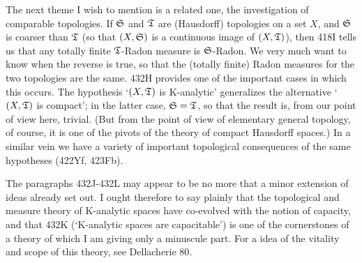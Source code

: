 {The next theme I wish to mention is a related one, the investigation of 
comparable topologies.   If $\frak S$ and $\frak T$ are (Hausdorff) 
topologies on a set $X$, and $\frak S$ is coarser than $\frak T$ (so 
that $(X,\frak S)$ is a continuous image of $(X,\frak T)$), then 
418I tells us that any totally finite $\frak T$-Radon 
measure is $\frak S$-Radon.   We very much want to know when the reverse 
is true, so that the (totally finite) Radon measures for the two 
topologies are the same.   432H provides one of the important cases in 
which this occurs.   The hypothesis `$(X,\frak T)$ is K-analytic' 
generalizes the alternative \lq$(X,\frak T)$ is compact';  in the latter 
case, $\frak S=\frak T$, so that the result is, from our point of view 
here, trivial.   (But from the point of view of elementary general 
topology, of course, it is one of the pivots of the theory of compact 
Hausdorff spaces.)   In a similar vein we have a variety of important 
topological consequences of the same hypotheses (422Yf, 423Fb). 
      
The paragraphs 432J-432L %
may appear to be no more that a minor 
extension of ideas already set out.   I ought therefore to say plainly 
that the topological and measure theory of K-analytic spaces have 
co-evolved with the notion of capacity, and that 432K (`K-analytic 
spaces are capacitable') is one of the cornerstones of a theory of which 
I am giving only a minuscule part.   For a idea of the vitality and 
scope of this theory, see {\smc Dellacherie 80}. 
}%
      
\discrpage 
  
